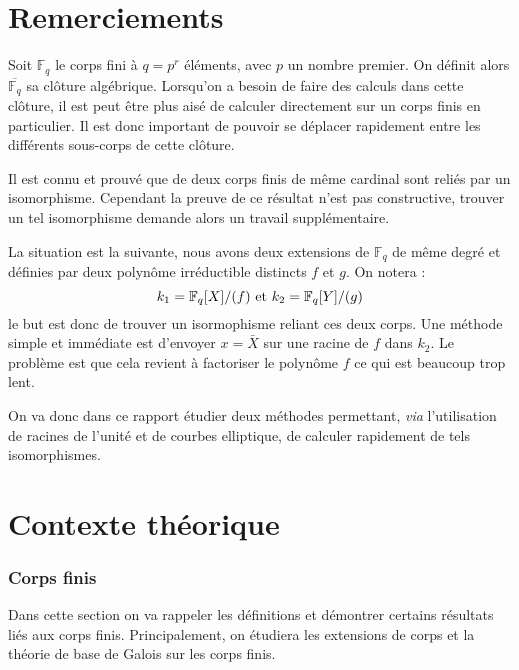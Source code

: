 \documentclass[a4paper]{article} %
\numberwithin{section}{part}
\numberwithin{equation}{section}
\newcommand\GF[1]{\mathbb{F}_{#1}}
\begin{document}
\newtheorem{thm}{Thèorème}[section]
\newtheorem{lem}[thm]{Lemme}
\newtheorem{cor}{Corollaire}[thm]
\newtheorem{prop}[thm]{Proposition}
\theoremstyle{definition}
\newtheorem{defn}[thm]{Définition}
\newtheorem*{ex}{Exemple}
\theoremstyle{remark}
\newtheorem{rem}{Remarque}[thm]

\part*{Remerciements}

\tableofcontents

Soit $\GF{q}$ le corps fini à $q = p^r$ éléments, avec $p$ un nombre premier. On
définit alors $\overline{\GF{q}}$ sa clôture algébrique. Lorsqu'on a besoin de
faire des calculs dans cette clôture, il est peut être plus aisé de calculer
directement sur un corps finis en particulier. Il est donc important de pouvoir
se déplacer rapidement entre les différents sous-corps de cette clôture.\par
Il est connu et prouvé que de deux corps finis de même cardinal sont reliés par
un isomorphisme. Cependant la preuve de ce résultat n'est pas constructive,
trouver un tel isomorphisme demande alors un travail supplémentaire.\par
La situation est la suivante, nous avons deux extensions de $\GF{q}$ de même
degré et définies par deux polynôme irréductible distincts $f$ et $g$. On notera
:
\[k_1=\GF{q}[X]/(f)\textup{ et }k_2=\GF{q}[Y]/(g)\]
le but est donc de trouver un isormophisme reliant ces deux corps. Une méthode
simple et immédiate est d'envoyer $x = \bar{X}$ sur une racine de $f$ dans
$k_2$. Le problème est que cela revient à factoriser le polynôme $f$ ce qui est
beaucoup trop lent.\par
On va donc dans ce rapport étudier deux méthodes permettant, \textit{via}
l'utilisation de racines de l'unité et de courbes elliptique, de calculer
rapidement de tels isomorphismes.


\part{Contexte théorique}

\section{Corps finis}
Dans cette section on va rappeler les définitions et démontrer certains 
résultats liés aux corps finis. Principalement, on étudiera les extensions 
de corps et la théorie de base de Galois sur les corps finis.
\end{document}
